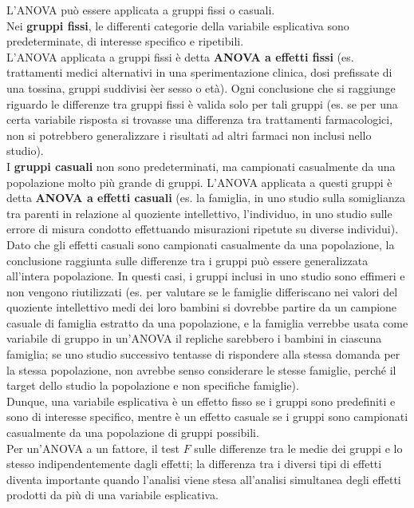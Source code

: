 \documentclass[10pt, draft]{book}
\begin{document}
L'ANOVA può essere applicata a gruppi fissi o casuali.\\
Nei \textbf{gruppi fissi}, le differenti categorie della variabile esplicativa sono predeterminate, di interesse specifico e ripetibili.\\
L'ANOVA applicata a gruppi fissi è detta \textbf{ANOVA a effetti fissi} (es. trattamenti medici alternativi in una sperimentazione clinica, dosi prefissate di una tossina, gruppi suddivisi èer sesso o età). Ogni conclusione che si raggiunge riguardo le differenze tra gruppi fissi è valida solo per tali gruppi (es. se per una certa variabile risposta si trovasse una differenza tra trattamenti farmacologici, non si potrebbero generalizzare i risultati ad altri farmaci non inclusi nello studio).\\
I \textbf{gruppi casuali} non sono predeterminati, ma campionati casualmente da una popolazione molto più grande di gruppi. L'ANOVA applicata a questi gruppi è detta \textbf{ANOVA a effetti casuali} (es. la famiglia, in uno studio sulla somiglianza tra parenti in relazione al quoziente intellettivo, l'individuo, in uno studio sulle errore di misura condotto effettuando misurazioni ripetute su diverse individui).\\
Dato che gli effetti casuali sono campionati casualmente da una popolazione, la conclusione raggiunta sulle differenze tra i gruppi può essere generalizzata all'intera popolazione. In questi casi, i gruppi inclusi in uno studio sono effimeri e non vengono riutilizzati (es. per valutare se le famiglie differiscano nei valori del quoziente intellettivo medi dei loro bambini si dovrebbe partire da un campione casuale di famiglia estratto da una popolazione, e la famiglia verrebbe usata come variabile di gruppo in un'ANOVA il repliche sarebbero i bambini in ciascuna famiglia; se uno studio successivo tentasse di rispondere alla stessa domanda per la stessa popolazione, non avrebbe senso considerare le stesse famiglie, perché il target dello studio la popolazione e non specifiche famiglie).\\
Dunque, una variabile esplicativa è un effetto fisso se i gruppi sono predefiniti e sono di interesse specifico, mentre è un effetto casuale se i gruppi sono campionati casualmente da una popolazione di gruppi possibili.\\
Per un'ANOVA a un fattore, il test $F$ sulle differenze tra le medie dei gruppi e lo stesso indipendentemente dagli effetti; la differenza tra i diversi tipi di effetti diventa importante quando l'analisi viene stesa all'analisi simultanea degli effetti prodotti da più di una variabile esplicativa.
\end{document}

